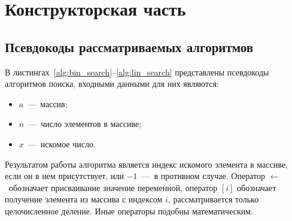 \chapter{Конструкторская часть}
\section{Псевдокоды рассматриваемых алгоритмов}

В листингах~\ref{alg:bin_search}--\ref{alg:lin_search} представлены псевдокоды алгоритмов поиска, входными данными для них являются:
\begin{itemize}[label=---]
	\item $a$~---~массив;
	\item $n$~---~число элементов в массиве;
	\item $x$~---~искомое число.
\end{itemize}

Результатом работы алгоритма является индекс искомого элемента в массиве, если он в нем присутствует, или $-1$~---~в противном случае. Оператор $\gets$~обозначает присваивание значение переменной, оператор $[i]$ обозначает получение элемента из массива с индексом $i$, рассматривается только целочисленное деление. Иные операторы подобны математическим.
\begin{algorithm}
\caption{Псевдокод алгоритма бинарного поиска.}\label{alg:bin_search}
\begin{algorithmic}
		\Else
		\EndIf
	\EndWhile
		\State {}
	\Else
		\State {}
	\EndIf
\end{algorithmic}
\end{algorithm}

\begin{algorithm}
\caption{Псевдокод алгоритма линейного поиска.}\label{alg:lin_search}
\begin{algorithmic}
			\State {}
		\EndIf
	\EndFor
	\State {}
\end{algorithmic}
\end{algorithm}


